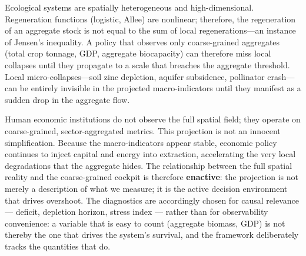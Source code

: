 \documentclass[twocolumn,10pt]{article}
\begin{document}
Ecological systems are spatially heterogeneous and high-dimensional. Regeneration functions (logistic, Allee) are nonlinear; therefore, the regeneration of an aggregate stock is not equal to the sum of local regenerations---an instance of Jensen's inequality. A policy that observes only coarse-grained aggregates (total crop tonnage, GDP, aggregate biocapacity) can therefore miss local collapses until they propagate to a scale that breaches the aggregate threshold. Local micro-collapses---soil zinc depletion, aquifer subsidence, pollinator crash---can be entirely invisible in the projected macro-indicators until they manifest as a sudden drop in the aggregate flow.

Human economic institutions do not observe the full spatial field; they operate on coarse-grained, sector-aggregated metrics. This projection is not an innocent simplification. Because the macro-indicators appear stable, economic policy continues to inject capital and energy into extraction, accelerating the very local degradations that the aggregate hides. The relationship between the full spatial reality and the coarse-grained cockpit is therefore \textbf{enactive}: the projection is not merely a description of what we measure; it is the active decision environment that drives overshoot. The diagnostics are accordingly chosen for causal relevance --- deficit, depletion horizon, stress index --- rather than for observability convenience: a variable that is easy to count (aggregate biomass, GDP) is not thereby the one that drives the system's survival, and the framework deliberately tracks the quantities that do.
\end{document}
